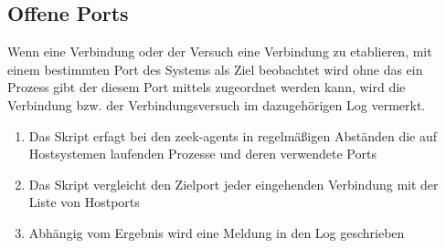 \subsection{Offene Ports}
Wenn eine Verbindung oder der Versuch eine Verbindung zu etablieren, mit einem bestimmten Port des Systems als Ziel beobachtet wird ohne das ein Prozess gibt der diesem Port mittels zugeordnet werden kann, wird die Verbindung bzw. der Verbindungsversuch im dazugehörigen Log vermerkt.
\begin{enumerate}
\item{Das Skript erfagt bei den zeek-agents in regelmäßigen Abständen die auf Hostsystemen laufenden Prozesse und deren verwendete Ports}
\item{Das Skript vergleicht den Zielport jeder eingehenden Verbindung mit der Liste von Hostports}
\item{Abhängig vom Ergebnis wird eine Meldung in den Log geschrieben}
\end{enumerate}
